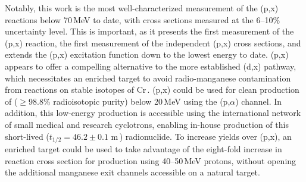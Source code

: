 

Notably, this work is the most well-characterized measurement of the (p,x) reactions below 70\,MeV to date, with cross sections measured  at the 6--10\% uncertainty level.
This is important, as it presents the first measurement of the (p,x) reaction,  the first measurement of the independent (p,x) cross sections, and extends the (p,x) excitation function down to the lowest energy to date. 
(p,x) appears to offer a compelling alternative to the more established (d,x) pathway, which necessitates an enriched  target to avoid radio-manganese contamination from reactions on stable isotopes of Cr\,\cite{Klein2000}.
(p,x) could be used for clean production of   ($\geq$98.8\% radioisotopic purity) below 20\,MeV using the (p,$\alpha$) channel.
In addition, this low-energy production is accessible using the international network of small medical and research cyclotrons, enabling in-house production of this short-lived ($t_{1/2}=46.2\pm0.1$ m\,\cite{Wang2017}) radionuclide.
To increase yields over (p,x), an enriched  target could be used to take advantage of the eight-fold increase in reaction cross section for production using 40--50\,MeV protons, without opening the additional manganese exit channels accessible on a natural target.



